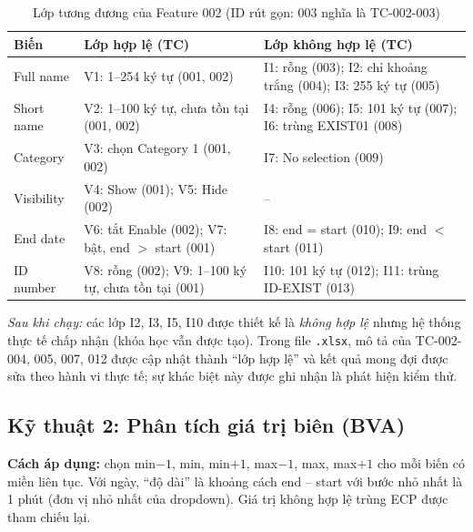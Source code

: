 \begin{table}[H]
\centering\footnotesize
\begin{tabular}{|l|L{5.0cm}|L{7.4cm}|}
\hline
{}\textbf{Biến} & \textbf{Lớp hợp lệ (TC)} & \textbf{Lớp không hợp lệ (TC)} \\ \hline
Full name & V1: 1--254 ký tự (001, 002) & I1: rỗng (003); I2: chỉ khoảng trắng (004); I3: 255 ký tự (005) \\ \hline
Short name & V2: 1--100 ký tự, chưa tồn tại (001, 002) & I4: rỗng (006); I5: 101 ký tự (007); I6: trùng EXIST01 (008) \\ \hline
Category & V3: chọn Category 1 (001, 002) & I7: No selection (009) \\ \hline
Visibility & V4: Show (001); V5: Hide (002) & -- \\ \hline
End date & V6: tắt Enable (002); V7: bật, end $>$ start (001) & I8: end = start (010); I9: end $<$ start (011) \\ \hline
ID number & V8: rỗng (002); V9: 1--100 ký tự, chưa tồn tại (001) & I10: 101 ký tự (012); I11: trùng ID-EXIST (013) \\ \hline
\end{tabular}
\caption{Lớp tương đương của Feature 002 (ID rút gọn: 003 nghĩa là TC-002-003)}
\end{table}
\textit{Sau khi chạy:} các lớp I2, I3, I5, I10 được thiết kế là \emph{không hợp lệ} nhưng hệ thống thực tế chấp nhận
(khóa học vẫn được tạo). Trong file \texttt{.xlsx}, mô tả của TC-002-004, 005, 007, 012 được cập nhật thành ``lớp hợp lệ''
và kết quả mong đợi được sửa theo hành vi thực tế; sự khác biệt này được ghi nhận là phát hiện kiểm thử.

\subsection{Kỹ thuật 2: Phân tích giá trị biên (BVA)}
\textbf{Cách áp dụng:} chọn min$-1$, min, min$+1$, max$-1$, max, max$+1$ cho mỗi biến có miền liên tục. Với ngày, ``độ dài''
là khoảng cách end -- start với bước nhỏ nhất là 1 phút (đơn vị nhỏ nhất của dropdown). Giá trị không hợp lệ trùng ECP được tham chiếu lại.

